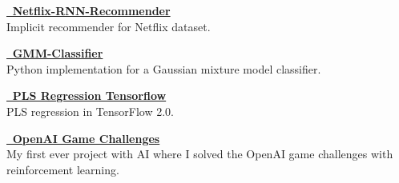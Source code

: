 % 
% 

{\textbf{\href{https://github.com/jiwidi/Netflix-RNN-Recommender}{\faGithub \, Netflix-RNN-Recommender}}} \\ 
Implicit recommender for Netflix dataset.



{\textbf{\href{https://github.com/jiwidi/gmm-classifier}{\faGithub \, GMM-Classifier}}} \\ 
Python implementation for a Gaussian mixture model classifier.



{\textbf{\href{https://github.com/jiwidi/PLS-regression-tensorflow}{\faGithub \, PLS Regression Tensorflow}}} \\ 
PLS regression in TensorFlow 2.0.

{\textbf{\href{https://github.com/AlwaysLearningDeeper/OpenAI_Challenges}{\faGithub \, OpenAI Game Challenges}}} \\ 
My first ever project with AI where I solved the OpenAI game challenges with reinforcement learning.




